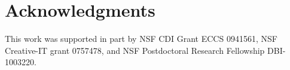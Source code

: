 \section{Acknowledgments}

This work was supported in part by NSF CDI Grant ECCS 0941561, NSF
Creative-IT grant 0757478, and NSF Postdoctoral Research Fellowship
DBI-1003220.



